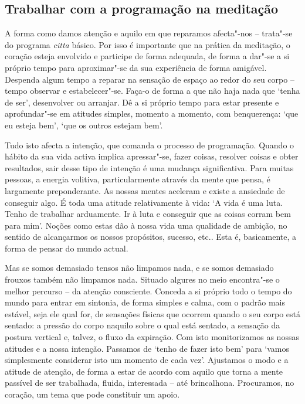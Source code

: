 \subsection{Trabalhar com a programação na meditação}

A forma como damos atenção e aquilo em que reparamos afecta"-nos -- trata"-se do
programa \emph{citta} básico. Por isso é importante que na prática da meditação,
o coração esteja envolvido e participe de forma adequada, de forma a dar"-se a si
próprio tempo para aproximar"-se da sua experiência de forma amigável. Despenda
algum tempo a reparar na sensação de espaço ao redor do seu corpo -- tempo
observar e estabelecer"-se. Faça-o de forma a que não haja nada que `tenha de
ser', desenvolver ou arranjar. Dê a si próprio tempo para estar presente e
aprofundar"-se em atitudes simples, momento a momento, com benquerença: `que eu
esteja bem', `que os outros estejam bem'.

Tudo isto afecta a intenção, que comanda o processo de programação. Quando o
hábito da sua vida activa implica apressar"-se, fazer coisas, resolver coisas e
obter resultados, sair desse tipo de intenção é uma mudança significativa. Para
muitas pessoas, a energia volitiva, particularmente através da mente que pensa,
é largamente preponderante. As nossas mentes aceleram e existe a ansiedade de
conseguir algo. É toda uma atitude relativamente à vida: `A vida é uma luta.
Tenho de trabalhar arduamente. Ir à luta e conseguir que as coisas corram bem
para mim'. Noções como estas dão à nossa vida uma qualidade de ambição, no
sentido de alcançarmos os nossos propósitos, sucesso, etc.. Esta é, basicamente,
a forma de pensar do mundo actual.

Mas se somos demasiado tensos não limpamos nada, e se somos demasiado frouxos
também não limpamos nada. Situado algures no meio encontra"-se o melhor percurso
-- da atenção consciente. Conceda a si próprio todo o tempo do mundo para entrar
em sintonia, de forma simples e calma, com o padrão mais estável, seja ele qual
for, de sensações físicas que ocorrem quando o seu corpo está sentado: a pressão
do corpo naquilo sobre o qual está sentado, a sensação da postura vertical e,
talvez, o fluxo da expiração. Com isto monitorizamos as nossas atitudes e a
nossa intenção. Passamos de `tenho de fazer isto bem' para `vamos simplesmente
considerar isto um momento de cada vez'. Ajustamos o modo e a atitude de
atenção, de forma a estar de acordo com aquilo que torna a mente passível de ser
trabalhada, fluida, interessada -- até brincalhona. Procuramos, no coração, um
tema que pode constituir um apoio.

